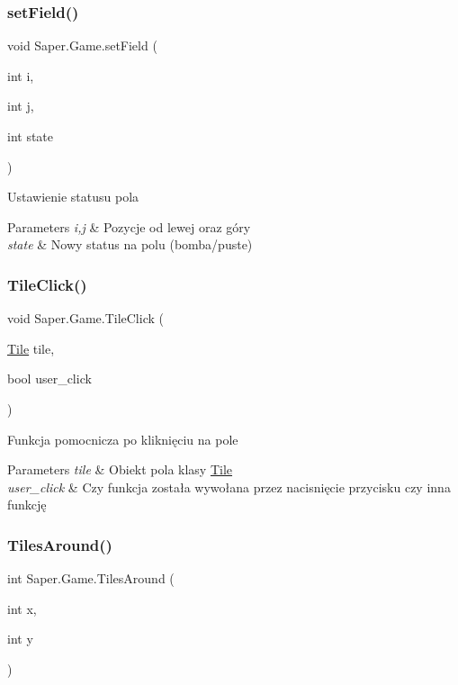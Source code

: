 \subsubsection{\texorpdfstring{setField()}{setField()}}
{\footnotesize\ttfamily void Saper.\+Game.\+set\+Field (\begin{DoxyParamCaption}\item[{int}]{i,  }\item[{int}]{j,  }\item[{int}]{state }\end{DoxyParamCaption})}

Ustawienie statusu pola 
\begin{DoxyParams}{Parameters}
{\em i,j} & Pozycje od lewej oraz góry \\
\hline
{\em state} & Nowy status na polu (bomba/puste) \\
\hline
\end{DoxyParams}
\mbox{\label{class_saper_1_1_game_ad7088e52259cb63a068213bf2856eebb}} 
\subsubsection{\texorpdfstring{TileClick()}{TileClick()}}
{\footnotesize\ttfamily void Saper.\+Game.\+Tile\+Click (\begin{DoxyParamCaption}\item[{\mbox{\hyperlink{class_saper_1_1_tile}{Tile}}}]{tile,  }\item[{bool}]{user\+\_\+click }\end{DoxyParamCaption})}

Funkcja pomocnicza po kliknięciu na pole 
\begin{DoxyParams}{Parameters}
{\em tile} & Obiekt pola klasy \mbox{\hyperlink{class_saper_1_1_tile}{Tile}} \\
\hline
{\em user\+\_\+click} & Czy funkcja została wywołana przez nacisnięcie przycisku czy inna funkcję \\
\hline
\end{DoxyParams}
\mbox{\label{class_saper_1_1_game_a77640c9261a148c9e68f28b0b02b57c8}} 
\subsubsection{\texorpdfstring{TilesAround()}{TilesAround()}}
{\footnotesize\ttfamily int Saper.\+Game.\+Tiles\+Around (\begin{DoxyParamCaption}\item[{int}]{x,  }\item[{int}]{y }\end{DoxyParamCaption})}

